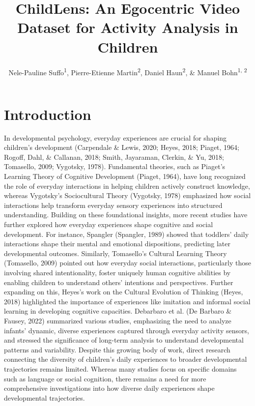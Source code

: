 \documentclass[
  man,floatsintext]{apa6}
\title{ChildLens: An Egocentric Video Dataset for Activity Analysis in Children}
\author{Nele-Pauline Suffo\textsuperscript{1}, Pierre-Etienne Martin\textsuperscript{2}, Daniel Haun\textsuperscript{2}, \& Manuel Bohn\textsuperscript{1, 2}}
\date{}
\affiliation{\vspace{0.5cm}\textsuperscript{1} Institute of Psychology in Education, Leuphana University Lüneburg\\\textsuperscript{2} Max Planck Institute for Evolutionary Anthropology}
\begin{document}
\maketitle

\section{Introduction}\label{introduction}

In developmental psychology, everyday experiences are crucial for shaping children's development (Carpendale \& Lewis, 2020; Heyes, 2018; Piaget, 1964; Rogoff, Dahl, \& Callanan, 2018; Smith, Jayaraman, Clerkin, \& Yu, 2018; Tomasello, 2009; Vygotsky, 1978). Fundamental theories, such as Piaget's Learning Theory of Cognitive Development (Piaget, 1964), have long recognized the role of everyday interactions in helping children actively construct knowledge, whereas Vygotsky's Sociocultural Theory (Vygotsky, 1978) emphasized how social interactions help transform everyday sensory experiences into structured understanding. Building on these foundational insights, more recent studies have further explored how everyday experiences shape cognitive and social development. For instance, Spangler (Spangler, 1989) showed that toddlers' daily interactions shape their mental and emotional dispositions, predicting later developmental outcomes. Similarly, Tomasello's Cultural Learning Theory (Tomasello, 2009) pointed out how everyday social interactions, particularly those involving shared intentionality, foster uniquely human cognitive abilities by enabling children to understand others' intentions and perspectives. Further expanding on this, Heyes's work on the Cultural Evolution of Thinking (Heyes, 2018) highlighted the importance of experiences like imitation and informal social learning in developing cognitive capacities. Debarbaro et al. (De Barbaro \& Fausey, 2022) summarized various studies, emphasizing the need to analyze infants' dynamic, diverse experiences captured through everyday activity sensors, and stressed the significance of long-term analysis to understand developmental patterns and variability. Despite this growing body of work, direct research connecting the diversity of children's daily experiences to broader developmental trajectories remains limited. Whereas many studies focus on specific domains such as language or social cognition, there remains a need for more comprehensive investigations into how diverse daily experiences shape developmental trajectories.
\end{document}
